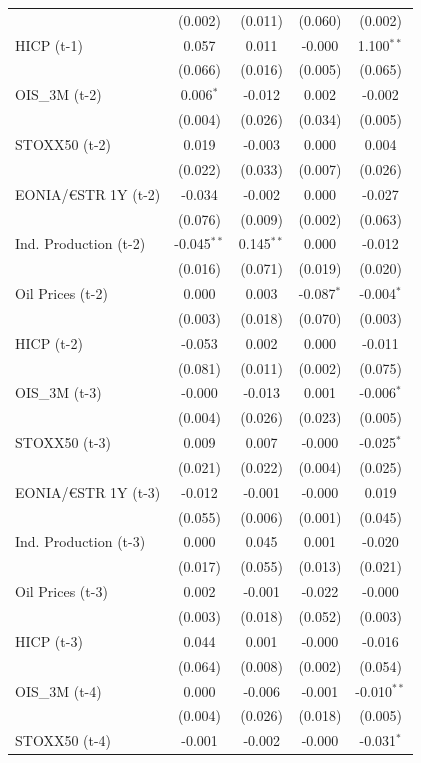 \begin{longtable}[t]{lcccc}
 & (0.002) & (0.011) & (0.060) & (0.002)\\
HICP (t-1) & 0.057 & 0.011 & -0.000 & 1.100$^{**}$\\
 & (0.066) & (0.016) & (0.005) & (0.065)\\
OIS\_3M (t-2) & 0.006$^{*}$ & -0.012 & 0.002 & -0.002\\
 & (0.004) & (0.026) & (0.034) & (0.005)\\
STOXX50 (t-2) & 0.019 & -0.003 & 0.000 & 0.004\\
 & (0.022) & (0.033) & (0.007) & (0.026)\\
EONIA/€STR 1Y (t-2) & -0.034 & -0.002 & 0.000 & -0.027\\
 & (0.076) & (0.009) & (0.002) & (0.063)\\
Ind. Production (t-2) & -0.045$^{**}$ & 0.145$^{**}$ & 0.000 & -0.012\\
 & (0.016) & (0.071) & (0.019) & (0.020)\\
Oil Prices (t-2) & 0.000 & 0.003 & -0.087$^{*}$ & -0.004$^{*}$\\
 & (0.003) & (0.018) & (0.070) & (0.003)\\
HICP (t-2) & -0.053 & 0.002 & 0.000 & -0.011\\
 & (0.081) & (0.011) & (0.002) & (0.075)\\
OIS\_3M (t-3) & -0.000 & -0.013 & 0.001 & -0.006$^{*}$\\
 & (0.004) & (0.026) & (0.023) & (0.005)\\
STOXX50 (t-3) & 0.009 & 0.007 & -0.000 & -0.025$^{*}$\\
 & (0.021) & (0.022) & (0.004) & (0.025)\\
EONIA/€STR 1Y (t-3) & -0.012 & -0.001 & -0.000 & 0.019\\
 & (0.055) & (0.006) & (0.001) & (0.045)\\
Ind. Production (t-3) & 0.000 & 0.045 & 0.001 & -0.020\\
 & (0.017) & (0.055) & (0.013) & (0.021)\\
Oil Prices (t-3) & 0.002 & -0.001 & -0.022 & -0.000\\
 & (0.003) & (0.018) & (0.052) & (0.003)\\
HICP (t-3) & 0.044 & 0.001 & -0.000 & -0.016\\
 & (0.064) & (0.008) & (0.002) & (0.054)\\
OIS\_3M (t-4) & 0.000 & -0.006 & -0.001 & -0.010$^{**}$\\
 & (0.004) & (0.026) & (0.018) & (0.005)\\
STOXX50 (t-4) & -0.001 & -0.002 & -0.000 & -0.031$^{*}$\\

\end{longtable}

